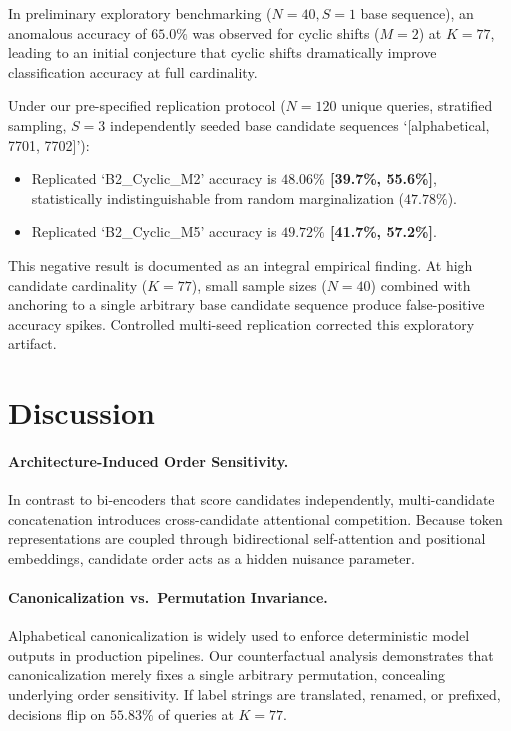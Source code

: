 \documentclass[10pt]{article}
\begin{document}
In preliminary exploratory benchmarking ($N=40, S=1$ base sequence), an anomalous accuracy of \textbf{$65.0\%$} was observed for cyclic shifts ($M=2$) at $K=77$, leading to an initial conjecture that cyclic shifts dramatically improve classification accuracy at full cardinality.

Under our pre-specified replication protocol ($N=120$ unique queries, stratified sampling, $S=3$ independently seeded base candidate sequences `[alphabetical, 7701, 7702]'):
\begin{itemize}
    \item Replicated `B2\_Cyclic\_M2' accuracy is \textbf{$48.06\%$ [39.7\%, 55.6\%]}, statistically indistinguishable from random marginalization ($47.78\%$).
    \item Replicated `B2\_Cyclic\_M5' accuracy is \textbf{$49.72\%$ [41.7\%, 57.2\%]}.
\end{itemize}
This negative result is documented as an integral empirical finding. At high candidate cardinality ($K=77$), small sample sizes ($N=40$) combined with anchoring to a single arbitrary base candidate sequence produce false-positive accuracy spikes. Controlled multi-seed replication corrected this exploratory artifact.

\section{Discussion}

\paragraph{Architecture-Induced Order Sensitivity.}
In contrast to bi-encoders that score candidates independently, multi-candidate concatenation introduces cross-candidate attentional competition. Because token representations are coupled through bidirectional self-attention and positional embeddings, candidate order acts as a hidden nuisance parameter.

\paragraph{Canonicalization vs.\ Permutation Invariance.}
Alphabetical canonicalization is widely used to enforce deterministic model outputs in production pipelines. Our counterfactual analysis demonstrates that canonicalization merely fixes a single arbitrary permutation, concealing underlying order sensitivity. If label strings are translated, renamed, or prefixed, decisions flip on $55.83\%$ of queries at $K=77$.
\end{document}
